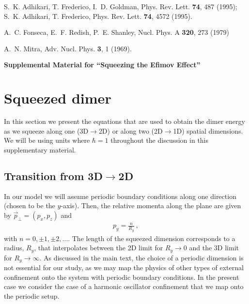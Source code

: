 \documentclass[twocolumn,showpacs,aps,prl,10pt]{revtex4}
\begin{document}
\begin{thebibliography}{99}
 S.~K. Adhikari, T. Frederico, I.~D. Goldman, Phys. Rev. Lett. {\bf 74}, 487 (1995); 
S.~K. Adhikari, T. Frederico, Phys. Rev. Lett. {\bf 74}, 4572 (1995).


 A.~C. Fonseca, E.~F.  Redish,  P.~E. Shanley, Nucl. Phys. A {\bf 320}, 273 (1979)

 A.~N. Mitra, Adv. Nucl. Phys. {\bf 3}, 1 (1969). 


  
\end{thebibliography}

\newpage
\widetext
\begin{center}
\textbf{\large Supplemental Material for ``Squeezing the Efimov Effect''}
\end{center}

\section{Squeezed dimer}
In this section we present the equations that are used to obtain the dimer energy 
as we squeeze along one (3D$\rightarrow$2D) 
or along two (2D$\rightarrow$1D) spatial dimensions. We will be using units where $\hbar=1$ throughout the 
discussion in this supplementary material.

\subsection{Transition from 3D$\rightarrow$2D}
In our model we will assume periodic boundary conditions along 
one direction (chosen to be the $y$-axis). Then, the relative momenta along the plane 
are given by $\vec p_\perp=(p_x,p_z)$ and
\begin{eqnarray}
p_y=\frac{n}{R_y} \ , \label{eq1}
\end{eqnarray}
with $n=0,\pm1,\pm2,\dots$. The length of the squeezed dimension corresponds to a 
radius, $R_y$, that interpolates between the 2D limit for $R_y\to 0$ and the 3D limit 
for $R_y\to \infty$. As discussed in the main text, the choice of a periodic dimension 
is not essential for our study, as we may map the physics of other types of external 
confinement onto the system with periodic boundary conditions. In the present case
we consider the case of a harmonic oscillator confinement that we map onto the 
periodic setup.
\end{document}
